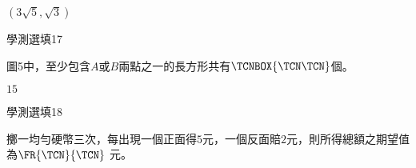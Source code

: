 \begin{QUESTIONS}
\begin{QUESTION}
\begin{QBODY}
        \end{QBODY}
        \begin{QFROMS}
        \end{QFROMS}
        \begin{QTAGS}\end{QTAGS}
        \begin{QANS}
            $(3\sqrt{5}, \sqrt{3})$
        \end{QANS}
        \begin{QSOLLIST}
        \end{QSOLLIST}
        \begin{QEMPTYSPACE}
        \end{QEMPTYSPACE}
    \end{QUESTION}
    \begin{QUESTION}
        \begin{ExamInfo}{85}{學測}{選填}{17}
        \end{ExamInfo}
        \begin{ExamAnsRateInfo}{}{}{}{}
        \end{ExamAnsRateInfo}
        \begin{QBODY}
            圖5中，至少包含$A$或$B$兩點之一的長方形共有$\TCNBOX{\TCN\TCN}$個。
        \end{QBODY}
        \begin{QFROMS}
        \end{QFROMS}
        \begin{QTAGS}\end{QTAGS}
        \begin{QANS}
            $15$
        \end{QANS}
        \begin{QSOLLIST}
        \end{QSOLLIST}
        \begin{QEMPTYSPACE}
        \end{QEMPTYSPACE}
    \end{QUESTION}
    \begin{QUESTION}
        \begin{ExamInfo}{85}{學測}{選填}{18}
        \end{ExamInfo}
        \begin{ExamAnsRateInfo}{}{}{}{}
        \end{ExamAnsRateInfo}
        \begin{QBODY}
            擲一均勻硬幣三次，每出現一個正面得$5$元，一個反面賠$2$元，則所得總額之期望值為$\FR{\TCN}{\TCN}$ 元。
        \end{QBODY}

\end{QUESTION}
\end{QUESTIONS}
